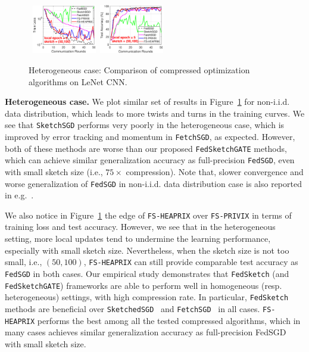 \documentclass[sigconf, anonymous, review]{acmart}
\begin{document}
\begin{figure}[t]
\begin{center}
{		}
				\mbox{\hspace{-0.15in}		
		\includegraphics[width=0.25\textwidth]{MNIST_figures/local5_sketch50_iid0_train_loss.eps}\hspace{-0.12in}
		\includegraphics[width=0.25\textwidth]{MNIST_figures/local5_sketch50_iid0_test_acc.eps}
		}
	\end{center}
	
	\caption{Heterogeneous case: Comparison of compressed optimization algorithms on LeNet CNN.}
    \label{fig:MNIST-iid0}
    
\end{figure}

\textbf{Heterogeneous case.} We plot similar set of results in Figure~\ref{fig:MNIST-iid0} for non-i.i.d. data distribution, which leads to more twists and turns in the training curves. 
We see that \texttt{SketchSGD} performs very poorly in the heterogeneous case, which is improved by error tracking and momentum in \texttt{FetchSGD}, as expected. 
However, both of these methods are worse than our proposed \texttt{FedSketchGATE} methods, which can achieve similar generalization accuracy as full-precision \texttt{FedSGD}, even with small sketch size (i.e., $75\times$ compression). 
Note that, slower convergence and worse generalization of \texttt{FedSGD} in non-i.i.d. data distribution case is also reported in e.g.~\citep{mcmahan2016communication,chen2020toward}. 

We also notice in Figure~\ref{fig:MNIST-iid0} the edge of \texttt{FS-HEAPRIX} over \texttt{FS-PRIVIX} in terms of training loss and test accuracy. 
However, we see that in the heterogeneous setting, more local updates tend to undermine the learning performance, especially with small sketch size.  
Nevertheless, when the sketch size is not too small, i.e., $(50,100)$, \texttt{FS-HEAPRIX} can still provide comparable test accuracy as \texttt{FedSGD} in both cases.
Our empirical study demonstrates that \texttt{FedSketch} (and \texttt{FedSketchGATE}) frameworks are able to perform well in homogeneous (resp. heterogeneous) settings, with high compression rate. 
In particular, \texttt{FedSketch} methods are beneficial over \texttt{SketchedSGD}~\citep{ivkin2019communication} and \texttt{FetchSGD}~\citep{rothchild2020fetchsgd} in all cases. 
\texttt{FS-HEAPRIX} performs the best among all the tested compressed algorithms, which in many cases achieves similar generalization accuracy as full-precision FedSGD with small sketch size. 
\end{document}
